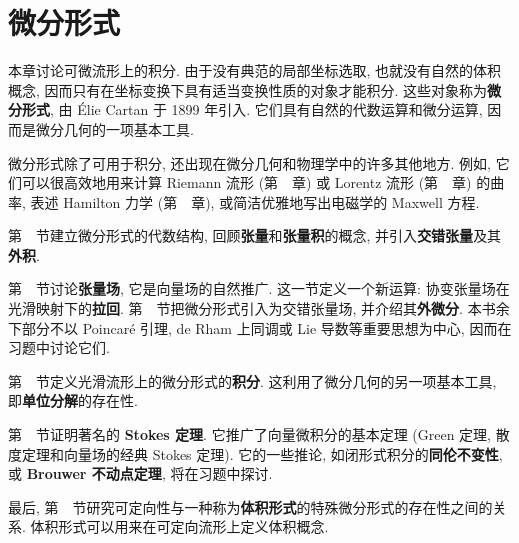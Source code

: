 \chapter{微分形式}\label{chap:differential-forms}
\begingroup
\renewcommand{\thefootnote}{}
\endgroup

本章讨论可微流形上的积分. 由于没有典范的局部坐标选取, 也就没有自然的体积概念, 因而只有在坐标变换下具有适当变换性质的对象才能积分. 这些对象称为\textbf{微分形式}, 由 Élie Cartan 于 1899 年引入. 它们具有自然的代数运算和微分运算, 因而是微分几何的一项基本工具.

微分形式除了可用于积分, 还出现在微分几何和物理学中的许多其他地方. 例如, 它们可以很高效地用来计算 Riemann 流形 (第~~章) 或 Lorentz 流形 (第~~章) 的曲率, 表述 Hamilton 力学 (第~~章), 或简洁优雅地写出电磁学的 Maxwell 方程.

第~~节建立微分形式的代数结构, 回顾\textbf{张量}和\textbf{张量积}的概念, 并引入\textbf{交错张量}及其\textbf{外积}.

第~~节讨论\textbf{张量场}, 它是向量场的自然推广. 这一节定义一个新运算: 协变张量场在光滑映射下的\textbf{拉回}. 第~~节把微分形式引入为交错张量场, 并介绍其\textbf{外微分}. 本书余下部分不以 Poincaré 引理, de Rham 上同调或 Lie 导数等重要思想为中心, 因而在习题中讨论它们.

第~~节定义光滑流形上的微分形式的\textbf{积分}. 这利用了微分几何的另一项基本工具, 即\textbf{单位分解}的存在性.

第~~节证明著名的 \textbf{Stokes 定理}. 它推广了向量微积分的基本定理 (Green 定理, 散度定理和向量场的经典 Stokes 定理). 它的一些推论, 如闭形式积分的\textbf{同伦不变性}, 或 \textbf{Brouwer 不动点定理}, 将在习题中探讨.

最后, 第~~节研究可定向性与一种称为\textbf{体积形式}的特殊微分形式的存在性之间的关系. 体积形式可以用来在可定向流形上定义体积概念.
